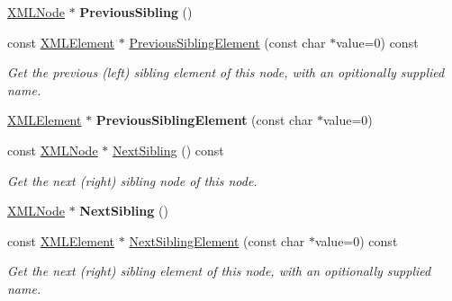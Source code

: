 \begin{DoxyCompactItemize}
\hyperlink{classtinyxml2_1_1XMLNode}{X\+M\+L\+Node} $\ast$ {\bfseries Previous\+Sibling} ()
\item 
\mbox{\label{classtinyxml2_1_1XMLNode_a9c5be451b9eb7e7907cd6097d563b6fd}} 
const \hyperlink{classtinyxml2_1_1XMLElement}{X\+M\+L\+Element} $\ast$ \hyperlink{classtinyxml2_1_1XMLNode_a9c5be451b9eb7e7907cd6097d563b6fd}{Previous\+Sibling\+Element} (const char $\ast$value=0) const
\begin{DoxyCompactList}\small\item\em Get the previous (left) sibling element of this node, with an opitionally supplied name. \end{DoxyCompactList}\item 
\mbox{\label{classtinyxml2_1_1XMLNode_ae9177fdc49cb89879f333581d5f734f1}} 
\hyperlink{classtinyxml2_1_1XMLElement}{X\+M\+L\+Element} $\ast$ {\bfseries Previous\+Sibling\+Element} (const char $\ast$value=0)
\item 
\mbox{\label{classtinyxml2_1_1XMLNode_a79db9ef0fe014d27790f2218b87bcbb5}} 
const \hyperlink{classtinyxml2_1_1XMLNode}{X\+M\+L\+Node} $\ast$ \hyperlink{classtinyxml2_1_1XMLNode_a79db9ef0fe014d27790f2218b87bcbb5}{Next\+Sibling} () const
\begin{DoxyCompactList}\small\item\em Get the next (right) sibling node of this node. \end{DoxyCompactList}\item 
\mbox{\label{classtinyxml2_1_1XMLNode_aeb7d4dfd8fb924ef86e7cb72183acbac}} 
\hyperlink{classtinyxml2_1_1XMLNode}{X\+M\+L\+Node} $\ast$ {\bfseries Next\+Sibling} ()
\item 
\mbox{\label{classtinyxml2_1_1XMLNode_a13f7ee3b111fadd63ecc940b5f0333c2}} 
const \hyperlink{classtinyxml2_1_1XMLElement}{X\+M\+L\+Element} $\ast$ \hyperlink{classtinyxml2_1_1XMLNode_a13f7ee3b111fadd63ecc940b5f0333c2}{Next\+Sibling\+Element} (const char $\ast$value=0) const
\begin{DoxyCompactList}\small\item\em Get the next (right) sibling element of this node, with an opitionally supplied name. \end{DoxyCompactList}\item 

\end{DoxyCompactItemize}
